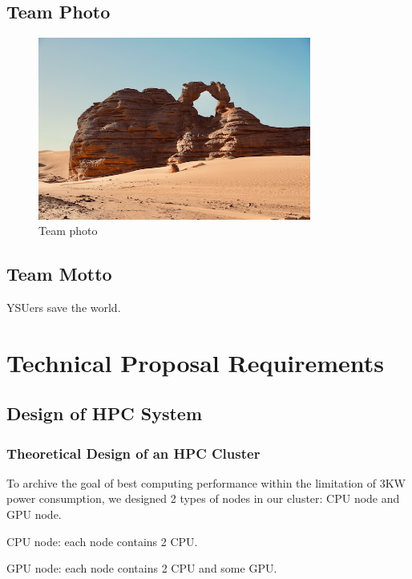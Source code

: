 \documentclass[a4paper,12pt]{article}
\begin{document}
\subsection{Team Photo}

\begin{figure}[H]
    \centering
    \includegraphics[width=0.8\textwidth]{Team_Photo.png}
    \caption{Team photo}
    \label{fig:team_photo}
\end{figure}


\subsection{Team Motto}

YSUers save the world.

\newpage

\section{Technical Proposal Requirements}

\subsection{Design of HPC System}

\subsubsection{Theoretical Design of an HPC Cluster}

To archive the goal of best computing performance within the limitation of 3KW power consumption, we designed 2 types of nodes in our cluster: CPU node and GPU node.

CPU node: each node contains 2 CPU.

GPU node: each node contains 2 CPU and some GPU.
\end{document}
